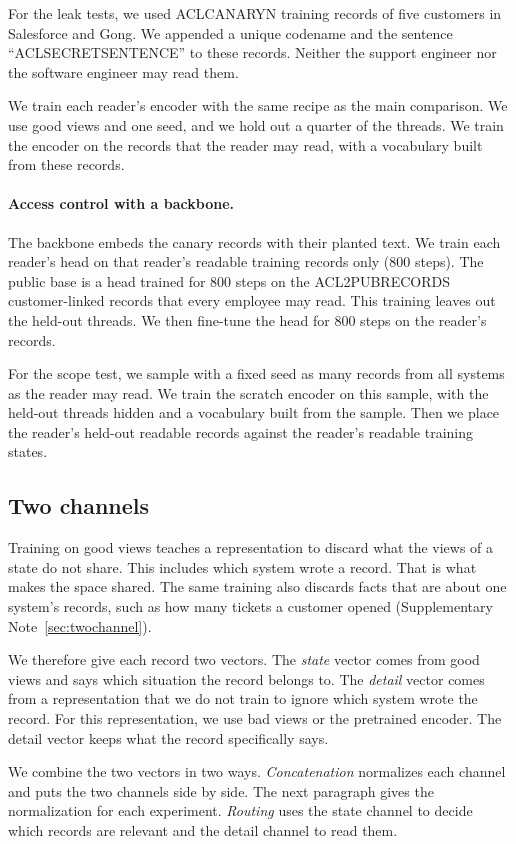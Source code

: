 \documentclass[11pt]{article}
\begin{document}
For the leak tests, we used ACLCANARYN training records of five customers in Salesforce and Gong. We appended a unique codename and the sentence ``ACLSECRETSENTENCE'' to these records. Neither the support engineer nor the software engineer may read them.

We train each reader's encoder with the same recipe as the main comparison. We use good views and one seed, and we hold out a quarter of the threads. We train the encoder on the records that the reader may read, with a vocabulary built from these records.

\paragraph{Access control with a backbone.} The backbone embeds the canary records with their planted text. We train each reader's head on that reader's readable training records only (800 steps). The public base is a head trained for 800 steps on the ACL2PUBRECORDS customer-linked records that every employee may read. This training leaves out the held-out threads. We then fine-tune the head for 800 steps on the reader's records.

For the scope test, we sample with a fixed seed as many records from all systems as the reader may read. We train the scratch encoder on this sample, with the held-out threads hidden and a vocabulary built from the sample. Then we place the reader's held-out readable records against the reader's readable training states.

\subsection{Two channels}
Training on good views teaches a representation to discard what the views of a state do not share. This includes which system wrote a record. That is what makes the space shared. The same training also discards facts that are about one system's records, such as how many tickets a customer opened (Supplementary Note~\ref{sec:twochannel}).

We therefore give each record two vectors. The \emph{state} vector comes from good views and says which situation the record belongs to. The \emph{detail} vector comes from a representation that we do not train to ignore which system wrote the record. For this representation, we use bad views or the pretrained encoder. The detail vector keeps what the record specifically says.

We combine the two vectors in two ways. \emph{Concatenation} normalizes each channel and puts the two channels side by side. The next paragraph gives the normalization for each experiment. \emph{Routing} uses the state channel to decide which records are relevant and the detail channel to read them.
\end{document}
